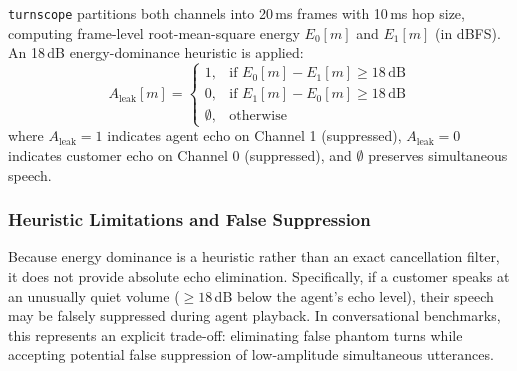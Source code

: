 \documentclass[10pt,journal,compsoc]{IEEEtran}
\begin{document}
\texttt{turnscope} partitions both channels into 20\,ms frames with 10\,ms hop size, computing frame-level root-mean-square energy $E_0[m]$ and $E_1[m]$ (in dBFS). An 18\,dB energy-dominance heuristic is applied:
\begin{equation}
A_{\text{leak}}[m] = 
\begin{cases}
1, & \text{if } E_0[m] - E_1[m] \ge 18\,\text{dB} \\
0, & \text{if } E_1[m] - E_0[m] \ge 18\,\text{dB} \\
\emptyset, & \text{otherwise}
\end{cases}
\end{equation}
where $A_{\text{leak}} = 1$ indicates agent echo on Channel 1 (suppressed), $A_{\text{leak}} = 0$ indicates customer echo on Channel 0 (suppressed), and $\emptyset$ preserves simultaneous speech.

\subsubsection{Heuristic Limitations and False Suppression}
Because energy dominance is a heuristic rather than an exact cancellation filter, it does not provide absolute echo elimination. Specifically, if a customer speaks at an unusually quiet volume ($\ge 18$\,dB below the agent's echo level), their speech may be falsely suppressed during agent playback. In conversational benchmarks, this represents an explicit trade-off: eliminating false phantom turns while accepting potential false suppression of low-amplitude simultaneous utterances.
\end{document}
